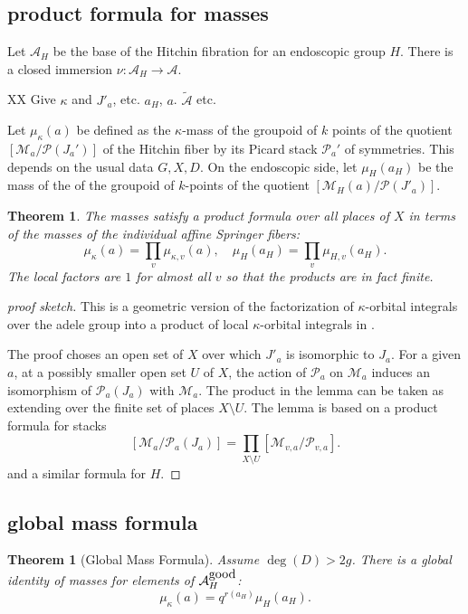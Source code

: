 \documentclass[brochure,english,12pt]{bourbaki}
\newtheorem{theorem}[equation]{Theorem}
\def\A{{\mathcal A}}
\def\M{{\mathcal M}}
\def\P{{\mathcal P}}
\def\tA{{\tilde{\mathcal A}}}
\begin{document}
\subsection{product formula for masses} %

Let $\A_H$ be the base of the Hitchin fibration for an endoscopic group $H$.  There
is a closed immersion $\nu:\A_H\to\A$.

XX Give $\kappa$ and $J'_a$, etc. $a_H$, $a$. $\tA$ etc.

Let $\mu_\kappa(a)$ be defined as the $\kappa$-mass of the groupoid of
$k$ points of the quotient $[\M_a/\P(J_a')]$ of the Hitchin fiber by
its Picard stack $\P_a'$ of symmetries.  This depends on the usual
data $G,X,D$.  On the endoscopic side, let $\mu_H(a_H)$ be the mass of
the of the groupoid of $k$-points of the quotient
$[\M_H(a)/\P(J'_a)]$.

\begin{theorem}  The masses satisfy a product formula over all places of $X$ in terms
of the masses of the individual affine Springer fibers:
\[
\mu_\kappa(a) =\prod_v \mu_{\kappa,v}(a), \quad \mu_H(a_H) = \prod_v \mu_{H,v}(a_H).
\]
The local factors are $1$ for almost all $v$ so that the products are in fact finite.
\end{theorem}

\begin{proof}[proof sketch]
This is a geometric version of the factorization of $\kappa$-orbital
integrals over the adele group into a product of local
$\kappa$-orbital integrals in \cite{Debuts}.

The proof choses an open set of $X$ over which $J'_a$ is isomorphic to
$J_a$. For a given $a$, at a possibly smaller open set $U$ of $X$, the
action of $\P_a$ on $\M_a$ induces an isomorphism of $\P_a(J_a)$ with
$\M_a$.  The product in the lemma can be taken as extending over the
finite set of places $X\setminus U$.  The lemma is based on a product
formula for stacks
\[
[\M_a/\P_a(J_a)] = \prod_{X\setminus U} [\M_{v,a}/\P_{v,a}].
\]
and a similar formula for $H$.
\end{proof}

\subsection{global mass formula}

\begin{theorem}[Global Mass Formula]
Assume $\deg(D)>2g$.  There is a global identity of masses for elements of $\A_H^{\hbox{good}}$:
\[
\mu_\kappa(a) = q^{r(a_H)} \mu_H(a_H).
\]
\end{theorem}
\end{document}
